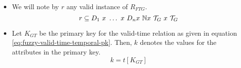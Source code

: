 \begin{definition}
\begin{itemize}
\item We will note by $r$ any valid instance of $R_{FTG}$. 
      \begin{equation}
       \label{eq:fuzzy-valid-time-instance}
      r \subseteq D_1\ x\ \ldots\ x\ D_n x\ \mathbb{N}  x\  \T_G\  x\ \T_G 
      \end{equation}

% 
% 
% 
    \item Let $K_{GT}$ be the primary key for the valid-time relation as given in equation \eqref{eq:fuzzy-valid-time-temporal-pk}. Then, $k$ denotes the values for the attributes in the primary key.
	  \begin{equation}
	   \label{eq:fuzzy-value-pk}
	  k = t\left[K_{GT} \right]
	  \end{equation}
% 
% 
% 
\end{itemize}


\end{definition}
